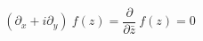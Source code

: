 \begin{equation}
(\partial_{x}+i\partial_{y})~f(z) =\frac{\partial}{\partial\bar{z}}~f(z)=0   \label{118}
\end{equation}


